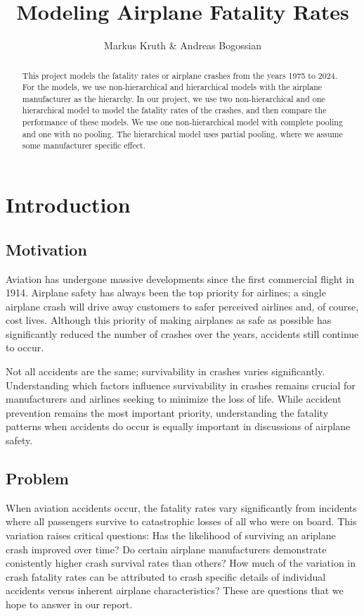 \documentclass[12pt,a4paper]{article}
\title{Modeling Airplane Fatality Rates}
\date{}
\author{Markus Kruth \& Andreas Bogossian}
\begin{document}
\maketitle

\begin{abstract}
  This project models the fatality rates or airplane crashes from the years 1975 to 2024. For the models, we use non-hierarchical and hierarchical models with the airplane manufacturer as the hierarchy. In our project, we use two non-hierarchical and one hierarchical model to model the fatality rates of the crashes, and then compare the performance of these models. We use one non-hierarchical model with complete pooling and one with no pooling. The hierarchical model uses partial pooling, where we assume some manufacturer specific effect.
\end{abstract}

\tableofcontents


\section{Introduction}
\subsection{Motivation}
Aviation has undergone massive developments since the first commercial flight in 1914. Airplane safety has always been the top priority for airlines; a single airplane crash will drive away customers to safer perceived airlines and, of course, cost lives. Although this priority of making airplanes as safe as possible has significantly reduced the number of crashes over the years, accidents still continue to occur.

Not all accidents are the same; survivability in crashes varies significantly. Understanding which factors influence survivability in crashes remains crucial for manufacturers and airlines seeking to minimize the loss of life. While accident prevention remains the most important priority, understanding the fatality patterns when accidents do occur is equally important in discussions of airplane safety.

\subsection{Problem}
When aviation accidents occur, the fatality rates vary significantly from incidents where all passengers survive to catastrophic losses of all who were on board. This variation raises critical questions: Has the likelihood of surviving an ariplane crash improved over time? Do certain airplane manufacturers demonstrate conistently higher crash survival rates than others? How much of the variation in crash fatality rates can be attributed to crash specific details of individual accidents versus inherent airplane characteristics? These are questions that we hope to answer in our report.
\end{document}
